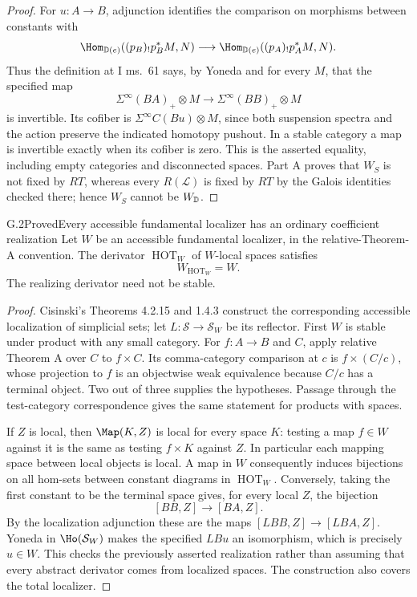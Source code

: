 \begin{proof}
For $u:A\to B$, adjunction identifies the comparison on morphisms between constants with
\[
 \Hom_{\D(e)}((p_B)_!p_B^*M,N)
 \longrightarrow
 \Hom_{\D(e)}((p_A)_!p_A^*M,N).
\]
Thus the definition at I ms.~61 says, by Yoneda and for every $M$, that the specified map
\[
 \Sigma^\infty(BA)_+\otimes M
 \longrightarrow\Sigma^\infty(BB)_+\otimes M
\]
is invertible. Its cofiber is $\Sigma^\infty C(Bu)\otimes M$, since both suspension spectra and the action preserve the indicated homotopy pushout. In a stable category a map is invertible exactly when its cofiber is zero. This is the asserted equality, including empty categories and disconnected spaces. Part A proves that $W_S$ is not fixed by $RT$, whereas every $R(\mathcal L)$ is fixed by $RT$ by the Galois identities checked there; hence $W_S$ cannot be $W_{\mathbb D}$.
\end{proof}

\begin{claim}{G.2}{Proved}{Every accessible fundamental localizer has an ordinary coefficient realization}
Let $W$ be an accessible fundamental localizer, in the relative-Theorem-A convention. The derivator $\operatorname{HOT}_W$ of $W$-local spaces satisfies
\[
 W_{\operatorname{HOT}_W}=W.
\]
The realizing derivator need not be stable.
\end{claim}
\begin{proof}
Cisinski's Theorems 4.2.15 and 1.4.3 construct the corresponding accessible localization of simplicial sets; let $L:\mathcal S\to\mathcal S_W$ be its reflector. First $W$ is stable under product with any small category. For $f:A\to B$ and $C$, apply relative Theorem A over $C$ to $f\times C$. Its comma-category comparison at $c$ is $f\times(C/c)$, whose projection to $f$ is an objectwise weak equivalence because $C/c$ has a terminal object. Two out of three supplies the hypotheses. Passage through the test-category correspondence gives the same statement for products with spaces.

If $Z$ is local, then $\Map(K,Z)$ is local for every space $K$: testing a map $f\in W$ against it is the same as testing $f\times K$ against $Z$. In particular each mapping space between local objects is local. A map in $W$ consequently induces bijections on all hom-sets between constant diagrams in $\operatorname{HOT}_W$. Conversely, taking the first constant to be the terminal space gives, for every local $Z$, the bijection
\[
 [BB,Z]\longrightarrow[BA,Z].
\]
By the localization adjunction these are the maps $[LBB,Z]\to[LBA,Z]$. Yoneda in $\Ho(\mathcal S_W)$ makes the specified $LBu$ an isomorphism, which is precisely $u\in W$. This checks the previously asserted realization rather than assuming that every abstract derivator comes from localized spaces. The construction also covers the total localizer.
\end{proof}

